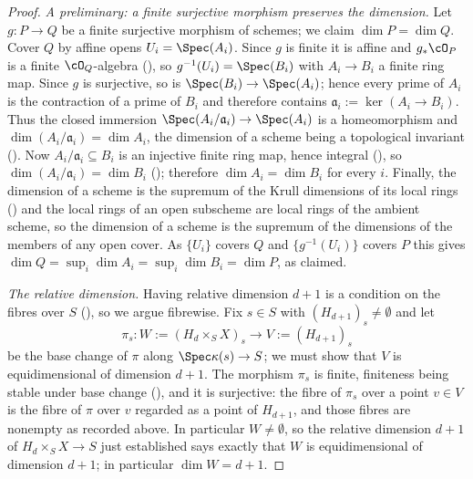 \begin{proof}
\emph{A preliminary: a finite surjective morphism preserves the
dimension.}  Let $g:P\to Q$ be a finite surjective morphism of schemes;
we claim $\dim P=\dim Q$.  Cover $Q$ by affine opens
$U_i=\Spec(A_i)$.  Since $g$ is finite it is affine and $g_*\cO_P$ is a
finite $\cO_Q$-algebra (), so
$g^{-1}(U_i)=\Spec(B_i)$ with $A_i\to B_i$ a finite ring map.  Since
$g$ is surjective, so is $\Spec(B_i)\to\Spec(A_i)$; hence every prime
of $A_i$ is the contraction of a prime of $B_i$ and therefore contains
$\mathfrak a_i:=\ker(A_i\to B_i)$.  Thus the closed immersion
$\Spec(A_i/\mathfrak a_i)\to\Spec(A_i)$ is a homeomorphism and
$\dim(A_i/\mathfrak a_i)=\dim A_i$, the dimension of a scheme being a
topological invariant ().  Now
$A_i/\mathfrak a_i\subseteq B_i$ is an injective finite ring map, hence
integral (), so
$\dim(A_i/\mathfrak a_i)=\dim B_i$
(); therefore $\dim A_i=\dim B_i$ for
every $i$.  Finally, the dimension of a scheme is the supremum of the
Krull dimensions of its local rings () and the
local rings of an open subscheme are local rings of the ambient scheme,
so the dimension of a scheme is the supremum of the dimensions of the
members of any open cover.  As $\{U_i\}$ covers $Q$ and
$\{g^{-1}(U_i)\}$ covers $P$ this gives
$\dim Q=\sup_i\dim A_i=\sup_i\dim B_i=\dim P$, as claimed.

\emph{The relative dimension.}  Having relative dimension $d+1$ is a
condition on the fibres over $S$ (), so we argue
fibrewise.  Fix $s\in S$ with $(H_{d+1})_s\neq\emptyset$ and let
\[
\pi_s:W:=(H_d\times_SX)_s\longrightarrow V:=(H_{d+1})_s
\]
be the base change of $\pi$ along $\Spec\kappa(s)\to S$; we must show
that $V$ is equidimensional of dimension $d+1$.  The morphism $\pi_s$
is finite, finiteness being stable under base change
(), and it is surjective: the fibre of
$\pi_s$ over a point $v\in V$ is the fibre of $\pi$ over $v$ regarded as
a point of $H_{d+1}$, and those fibres are nonempty as recorded above.
In particular $W\neq\emptyset$, so the relative dimension $d+1$ of
$H_d\times_SX\to S$ just established says exactly that $W$ is
equidimensional of dimension $d+1$; in particular $\dim W=d+1$.


\end{proof}
